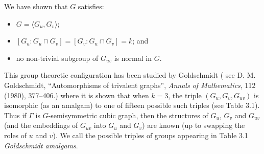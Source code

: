 \documentclass[12pt,a4paper,openany]{book}
\begin{document}
\bigskip

We have shown that $G$ satisfies:
\begin{itemize}
    \item $G = \langle G_u, G_v \rangle$;
    \item $[G_u : G_u \cap G_v] = [G_v : G_u \cap G_v] = k$; and
    \item no non-trivial subgroup of $G_{uv}$ is normal in $G$.
\end{itemize}

This group theoretic configuration has been studied by Goldschmidt ( see D. M. Goldschmidt, 
``Automorphisms of trivalent graphs'',
\textit{Annals of Mathematics}, 
112 (1980), 377--406.) where it is shown that when $k=3$, the triple $(G_u, G_v, G_{uv})$ is isomorphic (as an amalgam) to one of fifteen possible such triples (see Table 3.1). Thus if $\Gamma$ is $G$-semisymmetric cubic graph, then the structures of $G_u$, $G_v$ and $G_{uv}$ (and the embeddings of $G_{uv}$ into $G_u$ and $G_v$) are known (up to swapping the roles of $u$ and $v$). We call the possible triples of groups appearing in Table 3.1 \emph{Goldschmidt amalgams}.
\end{document}
